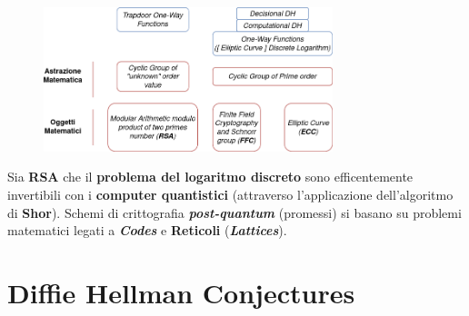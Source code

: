 \begin{flushleft}
    \begin{figure}[h]
        \centering
        \includegraphics[width=0.75\textwidth]{img/md_crypto.png}
    \end{figure}

    Sia \textbf{RSA} che il \textbf{problema del logaritmo discreto} sono efficentemente invertibili con i \textbf{computer quantistici} (attraverso l'applicazione dell'algoritmo di \textbf{Shor}). Schemi di crittografia \textbf{\textit{post-quantum}} (promessi) si basano su problemi matematici legati a \textbf{\textit{Codes}} e \textbf{Reticoli} (\textbf{\textit{Lattices}}).
\end{flushleft}

\section{Diffie Hellman Conjectures}

